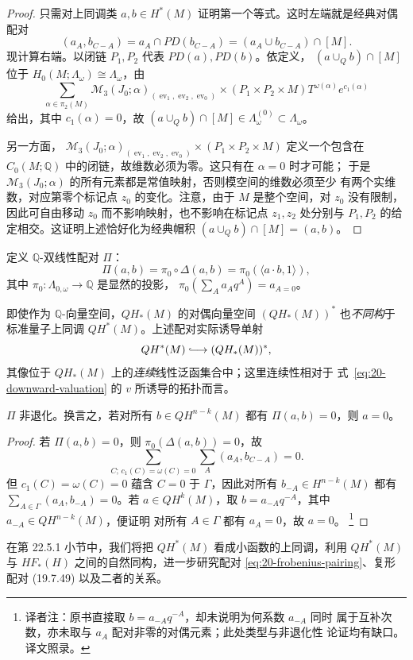 \begin{proof}
只需对上同调类 $a,b\in H^*(M)$ 证明第一个等式。这时左端就是经典\personPoincare{}对偶配对
\[
 (a_A,b_{C-A})=a_A\cap PD(b_{C-A})=(a_A\cup b_{C-A})\cap[M].
\]
现计算右端。以闭链 $P_1,P_2$ 代表 $PD(a),PD(b)$。依定义，
$(a\cup_Qb)\cap[M]$ 位于 $H_0(M;\Lambda_\omega)\cong\Lambda_\omega$，由
\[
 \sum_{\alpha\in\pi_2(M)}
 \mathcal M_3(J_0;\alpha)_{(\operatorname{ev}_1,\operatorname{ev}_2,
 \operatorname{ev}_0)}\times(P_1\times P_2\times M)
 T^{\omega(\alpha)}e^{c_1(\alpha)}
\]
给出，其中 $c_1(\alpha)=0$，故
$(a\cup_Qb)\cap[M]\in\Lambda_\omega^{(0)}\subset\Lambda_\omega$。

另一方面，\termFiberProduct{}
$\mathcal M_3(J_0;\alpha)_{(\operatorname{ev}_1,\operatorname{ev}_2,
\operatorname{ev}_0)}\times(P_1\times P_2\times M)$ 定义一个包含在
$C_0(M;\mathbb Q)$ 中的闭链，故维数必须为零。这只有在 $\alpha=0$ 时才可能；
于是 $\mathcal M_3(J_0;\alpha)$ 的所有元素都是常值映射，否则模空间的维数必须至少
有两个实维数，对应第零个标记点 $z_0$ 的变化。注意，由于 $M$ 是整个空间，对
$z_0$ 没有限制，因此可自由移动 $z_0$ 而不影响映射，也不影响在标记点 $z_1,z_2$
处分别与 $P_1,P_2$ 的给定相交。这证明上述\termFiberProduct{}恰好化为经典帽积
$(a\cup_Qb)\cap[M]=(a,b)$。
\end{proof}

定义 $\mathbb Q$-双线性配对 $\Pi$：
\begin{equation}
 \Pi(a,b)=\pi_0\circ\Delta(a,b)=\pi_0(\langle a\cdot b,1\rangle),
 \label{eq:20-rational-pairing}
\end{equation}
其中 $\pi_0:\Lambda_{0,\omega}\to\mathbb Q$ 是显然的投影，
$\pi_0(\sum_Aa_Aq^A)=a_{A=0}$。

\begin{remark}
\label{rem:20-continuous-dual}
即使作为 $\mathbb Q$-向量空间，$QH_*(M)$ 的对偶向量空间 $(QH_*(M))^*$ 也\emph{不同构}于
标准量子上同调 $QH^*(M)$。上述配对实际诱导单射
\[
 QH^*(M)\lhook\joinrel\longrightarrow(QH_*(M))^*,
\]
其像位于 $QH_*(M)$ 上的\emph{连续}线性泛函集合中；这里连续性相对于
式~\eqref{eq:20-downward-valuation} 的\termValuation{} $v$ 所诱导的拓扑而言。
\end{remark}

\begin{proposition}
\label{prop:20-pi-nondegenerate}
$\Pi$ 非退化。换言之，若对所有 $b\in QH^{n-k}(M)$ 都有 $\Pi(a,b)=0$，则 $a=0$。
\end{proposition}

\begin{proof}
若 $\Pi(a,b)=0$，则 $\pi_0(\Delta(a,b))=0$，故
\[
 \sum_{C;\,c_1(C)=\omega(C)=0}\sum_A(a_A,b_{C-A})=0.
\]
但 $c_1(C)=\omega(C)=0$ 蕴含 $C=0$ 于 $\Gamma$，因此对所有
$b_{-A}\in H^{n-k}(M)$ 都有 $\sum_{A\in\Gamma}(a_A,b_{-A})=0$。若
$a\in QH^k(M)$，取 $b=a_{-A}q^{-A}$，其中 $a_{-A}\in QH^{n-k}(M)$，便证明
对所有 $A\in\Gamma$ 都有 $a_A=0$，故 $a=0$。
\footnote{译者注：原书直接取 $b=a_{-A}q^{-A}$，却未说明为何系数 $a_{-A}$ 同时
属于互补次数，亦未取与 $a_A$ 配对非零的\personPoincare{}对偶元素；此处类型与非退化性
论证均有缺口。译文照录。}
\end{proof}

在第 22.5.1 小节中，我们将把 $QH^*(M)$ 看成小\personMorse{}函数的\personFloer{}上同调，利用
$QH^*(M)$ 与 $HF_*(H)$ 之间的自然同构，进一步研究\personFrobenius{}配对
\eqref{eq:20-frobenius-pairing}、\personFloer{}复形配对 (19.7.49) 以及二者的关系。
